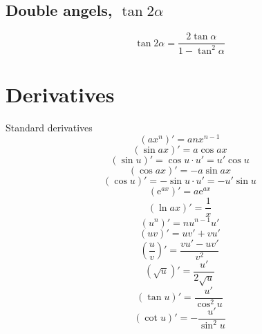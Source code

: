 \documentclass[a4paper, 10pt]{scrartcl}
\newcommand*\euler{\mathrm{e}}
\begin{document}
\subsection{Double angels, $\tan{2\alpha}$}
\[\tan{2\alpha} = \frac{2\tan{\alpha}}{1 - \tan^{2}{\alpha}}\]

\section{Derivatives}

Standard derivatives
\[(ax^{n})' = anx^{n-1}\]
\[(\sin{ax})' = a\cos{ax}\]
\[(\sin{u})' = \cos{u}\cdot u' = u'\cos{u}\]
\[(\cos{ax})' = -a\sin{ax}\]
\[(\cos{u})' = -\sin{u}\cdot u' = -u'\sin{u}\]
\[(\euler^{ax})' = a\euler^{ax}\]
\[(\ln{ax})' = \frac{1}{x}\]
\[(u^{n})' = nu^{n-1}u'\]
\[(uv)' = uv' + vu'\]
\[\left(\frac{u}{v}\right)' = \frac{vu' - uv'}{v^{2}}\]
\[\left(\sqrt{u}\right)' = \frac{u'}{2\sqrt{u}}\]
\[(\tan{u})' = \frac{u'}{\cos^{2}{u}}\]
\[(\cot{u})' = -\frac{u'}{\sin^{2}{u}}\]
\end{document}

